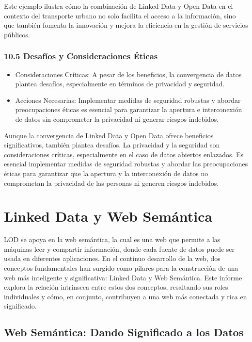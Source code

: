 \documentclass[11pt]{report}
\begin{document}
Este ejemplo ilustra cómo la combinación de Linked Data y Open Data en el contexto del transporte urbano no solo facilita el acceso a la información, sino que también fomenta la innovación y mejora la eficiencia en la gestión de servicios públicos.


\subsection*{10.5 Desafíos y Consideraciones Éticas}
\begin{itemize}
  \item Consideraciones Críticas: A pesar de los beneficios, la convergencia de datos plantea desafíos, especialmente en términos de privacidad y seguridad.
  \item Acciones Necesarias: Implementar medidas de seguridad robustas y abordar preocupaciones éticas es esencial para garantizar la apertura e interconexión de datos sin comprometer la privacidad ni generar riesgos indebidos.
\end{itemize}
		
		Aunque la convergencia de Linked Data y Open Data ofrece beneficios significativos, también plantea desafíos. La privacidad y la seguridad son consideraciones críticas, especialmente en el caso de datos abiertos enlazados. Es esencial implementar medidas de seguridad robustas y abordar las preocupaciones éticas para garantizar que la apertura y la interconexión de datos no comprometan la privacidad de las personas ni generen riesgos indebidos.
	\chapter{Linked Data y Web Semántica}
	LOD se apoya en la web semántica, la cual es
	una web que permite a las máquinas leer y
	compartir información, donde cada fuente de
	datos puede ser usada en diferentes aplicaciones. 
	En el continuo desarrollo de la web, dos conceptos fundamentales han surgido como pilares para la construcción de una web más inteligente y significativa: Linked Data y Web Semántica. Este informe explora la relación intrínseca entre estos dos conceptos, resaltando sus roles individuales y cómo, en conjunto, contribuyen a una web más conectada y rica en significado.
	
	\section{Web Semántica: Dando Significado a los Datos}
	
\end{document}

